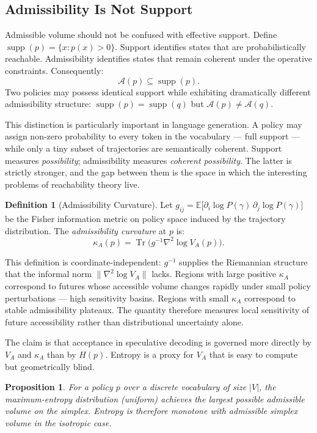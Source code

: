 \documentclass[11pt, a4paper, openany]{book}
\theoremstyle{plain}
\newtheorem{proposition}[theorem]{Proposition}
\theoremstyle{definition}
\newtheorem{definition}[theorem]{Definition}
\theoremstyle{remark}
\begin{document}
\subsection{Admissibility Is Not Support}

Admissible volume should not be confused with effective support.
Define $\operatorname{supp}(p) = \{x : p(x) > 0\}$.
Support identifies states that are probabilistically reachable.
Admissibility identifies states that remain coherent under the operative constraints.
Consequently:
\[
  \mathcal{A}(p) \subseteq \operatorname{supp}(p).
\]
Two policies may possess identical support while exhibiting dramatically
different admissibility structure:
$\operatorname{supp}(p) = \operatorname{supp}(q)$ but $\mathcal{A}(p) \neq \mathcal{A}(q)$.

This distinction is particularly important in language generation.
A policy may assign non-zero probability to every token in the vocabulary ---
full support --- while only a tiny subset of trajectories are semantically coherent.
Support measures \emph{possibility}; admissibility measures \emph{coherent possibility}.
The latter is strictly stronger, and the gap between them is the space in which
the interesting problems of reachability theory live.

\begin{definition}[Admissibility Curvature]
  Let $g_{ij} = \mathbb{E}\bigl[\partial_i \log P(\gamma)\,\partial_j \log P(\gamma)\bigr]$
  be the Fisher information metric on policy space induced by the trajectory
  distribution.
  The \emph{admissibility curvature} at $p$ is:
  \[
    \kappa_A(p) = \operatorname{Tr}\!\bigl(g^{-1} \nabla^2 \log V_A(p)\bigr).
  \]
\end{definition}

This definition is coordinate-independent: $g^{-1}$ supplies the Riemannian
structure that the informal norm $\|\nabla^2 \log V_A\|$ lacks.
Regions with large positive $\kappa_A$ correspond to futures whose accessible
volume changes rapidly under small policy perturbations --- high sensitivity basins.
Regions with small $\kappa_A$ correspond to stable admissibility plateaux.
The quantity therefore measures local sensitivity of future accessibility
rather than distributional uncertainty alone.

The claim is that acceptance in speculative decoding is governed
more directly by $V_A$ and $\kappa_A$ than by $H(p)$.
Entropy is a proxy for $V_A$ that is easy to compute but geometrically blind.

\begin{proposition}
  For a policy $p$ over a discrete vocabulary of size $|V|$, the
  maximum-entropy distribution (uniform) achieves the largest possible
  admissible volume on the simplex.
  Entropy is therefore monotone with admissible simplex volume in the
  isotropic case.
\end{proposition}
\end{document}
